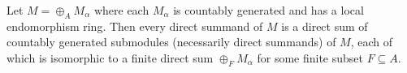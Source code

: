 Let $M = \oplus_A M_\alpha$ where each $M_\alpha$ is countably generated and has a local endomorphism ring. Then every direct summand of $M$ is a direct sum of countably generated submodules (necessarily direct summands) of $M$, each of which is isomorphic to a finite direct sum $\oplus_F M_\alpha$ for some finite subset $F \subseteq A$.
